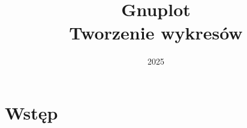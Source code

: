 \documentclass{beamer}
\author{}
\title{Gnuplot \\ Tworzenie wykresów}
\date{2025}
\begin{document}
\maketitle

\section{Wstęp}


% 
\end{document}
